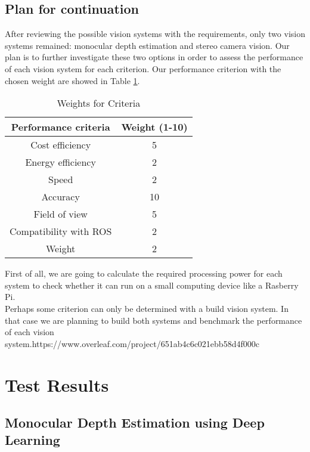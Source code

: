 \documentclass{article}[a4paper]
\begin{document}
\newpage
\subsection{Plan for continuation}

After reviewing the possible vision systems with the requirements, only two vision systems remained: monocular depth estimation and stereo camera vision. Our plan is to further investigate these two options in order to assess the performance of each vision system for each criterion. Our performance criterion with the chosen weight are showed in Table \ref{tab:criteria_weights}. 
\\

\begin{table}[H]
    \centering
    \begin{tabular}{|c|c|}
        \hline
        \textbf{Performance criteria} & \textbf{Weight (1-10)} \\
        \hline
        Cost efficiency & 5 \\
        Energy efficiency & 2 \\
        Speed & 2 \\
        Accuracy & 10 \\
        Field of view & 5 \\
        Compatibility with ROS & 2 \\
        Weight & 2 \\
        \hline
    \end{tabular}
    \caption{Weights for Criteria}
    \label{tab:criteria_weights}
\end{table}

First of all, we are going to calculate the required processing power for each system to check whether it can run on a small computing device like a Rasberry Pi. \\
Perhaps some criterion can only be determined with a build vision system. In that case we are planning to build both systems and benchmark the performance of each vision system.https://www.overleaf.com/project/651ab4c6c021ebb58d4f000c

\newpage
\section{Test Results}
\subsection{Monocular Depth Estimation using Deep Learning}
\end{document}
